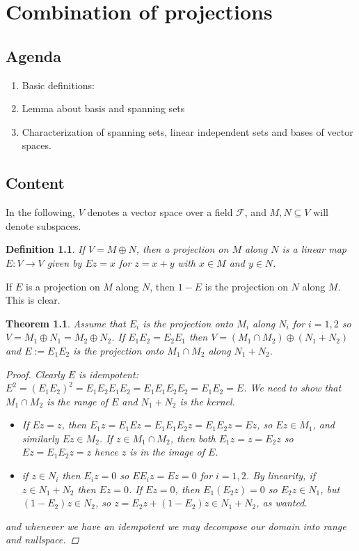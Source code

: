 \documentclass[10pt,twoside,openany,final]{memoir}
\theoremstyle{break}
\newtheorem{theorem}[section]{Theorem}
\newtheorem{definition}[section]{Definition}
\theoremstyle{Break}
\newcommand{\F}{\mathcal{F}}
\begin{document}
\chapter{Combination of projections}
\section*{Agenda}
\begin{enumerate}
	\item Basic definitions: 
	\item Lemma about basis and spanning sets
	\item Characterization of spanning sets, linear independent sets and bases of vector spaces.
\end{enumerate}
\section*{Content}
In the following, $V$ denotes a vector space over a field $\F$, and $M,N\subseteq V$ will denote subspaces.
\begin{definition}
	If $V=M \oplus N$, then a projection on $M$ along $N$ is a linear map $E \colon V \to V$ given by $Ez=x$ for $z=x+y$ with $x \in M$ and $y \in N$.
\end{definition}
If $E$ is a projection on $M$ along $N$, then $1-E$ is the projection on $N$ along $M$. This is clear.
\begin{theorem}
	Assume that $E_i$ is the projection onto $M_i$ along $N_i$ for $i=1,2$ so $V=M_1 \oplus N_1=M_2 \oplus N_2$. If $E_1E_2=E_2E_1$ then $V=(M_1 \cap M_2) \oplus (N_1 +N_2)$ and $E:=E_1E_2$ is the projection onto $M_1 \cap M_2$ along $N_1+N_2$.
	\begin{proof}
	Clearly $E$ is idempotent: $E^2=(E_1E_2)^2=E_1E_2E_1E_2=E_1E_1E_2E_2=E_1E_2=E$. We need to show that $M_1 \cap M_2$ is the range of $E$ and $N_1+N_2$ is the kernel. 
\begin{itemize}
	\item If $Ez=z$, then $E_1z=E_1Ez=E_1E_1E_2z=E_1E_2z=Ez$, so $Ez \in M_1$, and similarly $Ez \in M_2$. If $z \in M_1 \cap M_2$, then both $E_1z=z=E_2z$ so $Ez=E_1E_2z=z$ hence $z$ is in the image of $E$.
	\item if $z \in N_i$ then $E_iz=0$ so $E E_iz=Ez=0$ for $i=1,2$. By linearity, if $z \in N_1 + N_2$ then $Ez=0$. If $Ez=0$, then $E_1(E_2z)=0$ so $E_2z \in N_1$, but $(1-E_2)z \in N_2$, so $z=E_2z+(1-E_2)z \in N_1+N_2$, as wanted. 
\end{itemize}
and whenever we have an idempotent we may decompose our domain into range and nullspace.
	\end{proof}
\end{theorem}
\end{document}
